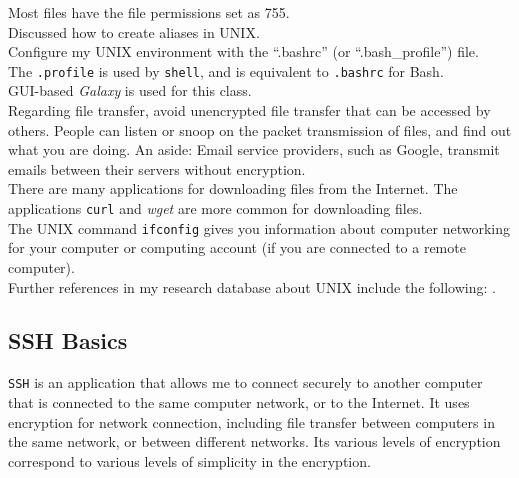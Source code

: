 Most files have the file permissions set as 755. \\

Discussed how to create aliases in UNIX. \\

Configure my UNIX environment with the ``.bashrc'' (or ``.bash\_profile'') file.  \\

The {\tt .profile} is used by {\tt shell}, and is equivalent to {\tt .bashrc} for Bash. \\

GUI-based {\it Galaxy} is used for this class. \\


Regarding file transfer, avoid unencrypted file transfer that can be accessed by others. People can listen or snoop on the packet transmission of files, and find out what you are doing. An aside: Email service providers, such as Google, transmit emails between their servers without encryption. \\

There are many applications for downloading files from the Internet. The applications {\tt curl} and {\it wget} are more common for downloading files. \\

The UNIX command {\tt ifconfig} gives you information about computer networking for your computer or computing account (if you are connected to a remote computer). \\





Further references in my research database about UNIX include the following: \cite{Apple2011,Kernighan1984,Kerrisk2010,Mitchell2001,Petersen2008,Raymond2004,Raymond2004a,Rochkind2004,Rosen2007a,Stallings2005,Stevens2013,Storimer2012,VibrantPublishers2010a,VibrantPublishers2011b,VibrantPublishers2011c,VibrantPublishers2011h}.

\subsection{SSH Basics}
\label{ssec:SSHBasics}


{\tt SSH} is an application that allows me to connect securely to another computer that is connected to the same computer network, or to the Internet. It uses encryption for network connection, including file transfer between computers in the same network, or between different networks. Its various levels of encryption correspond to various levels of simplicity in the encryption. \\


